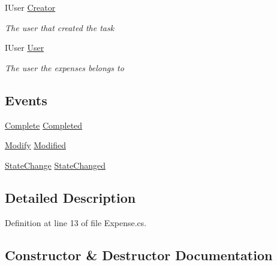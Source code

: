 \begin{DoxyCompactItemize}
I\+User \hyperlink{class_plex_byte_1_1_mo_cap_1_1_interactions_1_1_expense_a4cddfba32109480eebc14f394570e61a}{Creator}
\begin{DoxyCompactList}\small\item\em The user that created the task \end{DoxyCompactList}\item 
I\+User \hyperlink{class_plex_byte_1_1_mo_cap_1_1_interactions_1_1_expense_ace5418670b51a3c323cc8860e0a16ef6}{User}
\begin{DoxyCompactList}\small\item\em The user the expenses belongs to \end{DoxyCompactList}\end{DoxyCompactItemize}
\subsection*{Events}
\begin{DoxyCompactItemize}
\item 
\hyperlink{namespace_plex_byte_1_1_mo_cap_1_1_interactions_ac81ac3321ab2b018c75ad2c18ec15b9e}{Complete} \hyperlink{class_plex_byte_1_1_mo_cap_1_1_interactions_1_1_expense_acd33667c06f7c1c8a3ecb7843c4d37d2}{Completed}
\item 
\hyperlink{namespace_plex_byte_1_1_mo_cap_1_1_interactions_a490186f613e46adce26244f3b2c78a58}{Modify} \hyperlink{class_plex_byte_1_1_mo_cap_1_1_interactions_1_1_expense_a6663b45ef8c6dce85cf2430748d4c3b1}{Modified}
\item 
\hyperlink{namespace_plex_byte_1_1_mo_cap_1_1_interactions_af2ff213e81451f96fc74bfad114cecde}{State\+Change} \hyperlink{class_plex_byte_1_1_mo_cap_1_1_interactions_1_1_expense_a7679bcdaa6ea38ebace9d9ed2013a16a}{State\+Changed}
\end{DoxyCompactItemize}


\subsection{Detailed Description}


Definition at line 13 of file Expense.\+cs.



\subsection{Constructor \& Destructor Documentation}
